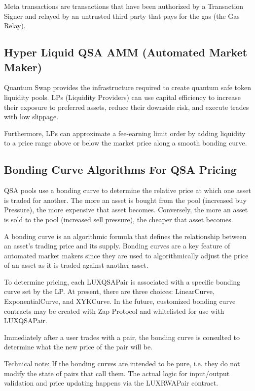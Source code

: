 \documentclass[11pt]{article}
\begin{document}
Meta transactions are transactions that have been authorized by a Transaction Signer and relayed by an untrusted third party that pays for the gas (the Gas Relay).


\subsection{Hyper Liquid QSA AMM (Automated Market Maker)}

Quantum Swap provides the infrastructure required to create quantum safe token liquidity pools. LPs (Liquidity Providers) can use capital efficiency to increase their exposure to preferred assets, reduce their downside risk, and execute trades with low slippage.


Furthermore, LPs can approximate a fee-earning limit order by adding liquidity to a price range above or below the market price along a smooth bonding curve.


\subsection{Bonding Curve Algorithms For QSA Pricing}

QSA pools use a bonding curve to determine the relative price at which one asset is traded for another. The more an asset is bought from the pool (increased buy Pressure), the more expensive that asset becomes. Conversely, the more an asset is sold to the pool (increased sell pressure), the cheaper that asset becomes.


A bonding curve is an algorithmic formula that defines the relationship between an asset's trading price and its supply. Bonding curves are a key feature of automated market makers since they are used to algorithmically adjust the price of an asset as it is traded against another asset.


To determine pricing, each LUXQSAPair is associated with a specific bonding curve set by the LP. At present, there are three choices: LinearCurve, ExponentialCurve, and XYKCurve. In the future, customized bonding curve contracts may be created with Zap Protocol and whitelisted for use with LUXQSAPair.


Immediately after a user trades with a pair, the bonding curve is consulted to determine what the new price of the pair will be.


Technical note: If the bonding curves are intended to be pure, i.e. they do not modify the state of pairs that call them. The actual logic for input/output validation and price updating happens via the LUXRWAPair contract.
\end{document}
